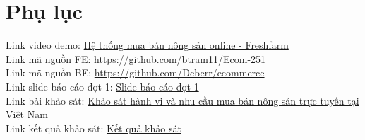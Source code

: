 \section{Phụ lục}
Link video demo: \href{https://drive.google.com/drive/folders/1WIkZk59qNwLv6xg5ciSjTpwEwBSiGjfA?usp=sharing}{Hệ thống mua bán nông sản online - Freshfarm}
\\
Link mã nguồn FE: \href{https://github.com/btram11/Ecom-251}{https://github.com/btram11/Ecom-251}
\\
Link mã nguồn BE: \href{https://github.com/Dcberr/ecommerce}{https://github.com/Dcberr/ecommerce}
\\
Link slide báo cáo đợt 1: \href{https://drive.google.com/file/d/1iOF1_lcq0HA3_AmuNW--uoeXSlluXSp1/view?usp=sharing}{Slide báo cáo đợt 1}
\\
Link bài khảo sát: \href{https://docs.google.com/forms/d/e/1FAIpQLSfQ6oedcCU0r5j28dewqXtWODRj9iULL5hfA-qXxKz5sdz38g/viewform?usp=sharing&ouid=104488604910592294772}{Khảo sát hành vi và nhu cầu mua bán nông sản trực tuyến tại Việt Nam}
\\
Link kết quả khảo sát: \href{https://docs.google.com/spreadsheets/d/1lP4EszSsv3EyGWgQPPo672zaO7ncyHhMsGXD3eavk1Y/edit?usp=sharing}{Kết quả khảo sát}
